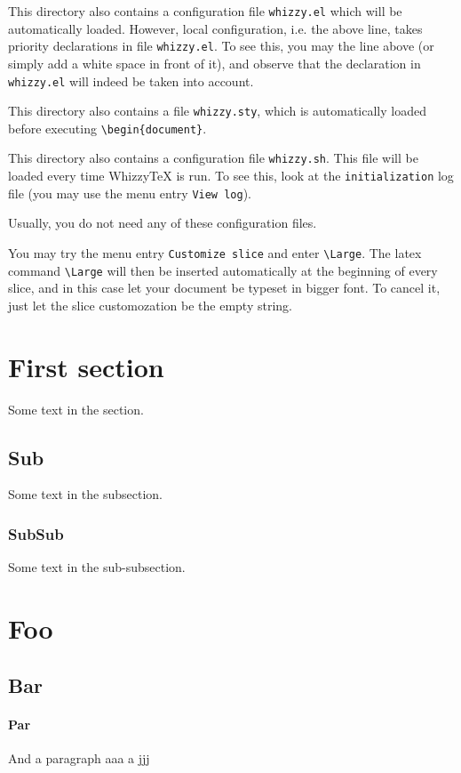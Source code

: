 \documentclass{article}
\begin{document}
This directory also contains a configuration file \texttt{whizzy.el} which
will be automatically loaded.  However, local configuration, {i.e.} the above
line, takes priority declarations in file \texttt{whizzy.el}.  To see this,
you may the line above (or simply add a white space in front of it), and
observe that the declaration in \texttt{whizzy.el} will indeed be taken into
account.

This directory also contains a file \texttt{whizzy.sty}, which is
automatically loaded before executing \verb$\begin{document}$.

This directory also contains a configuration file \texttt{whizzy.sh}.
This file will be loaded every time WhizzyTeX is run. To see this, look 
at the \texttt{initialization} log file (you may use the menu entry 
\texttt{View log}). 

Usually, you do not need any of these configuration files. 

You may try the menu entry \texttt{Customize slice} and enter 
\verb"\Large". The latex command \verb"\Large" will then be inserted
automatically at the beginning of every slice, and in this case let your
document be typeset in bigger font. To cancel it, just let the slice 
customozation be the empty string. 

\section {First section}

Some text in the section.   
 
\subsection {Sub}
  
Some text in the subsection.

\subsubsection {SubSub} 

Some text in the sub-subsection. 


\section{Foo}

\subsection {Bar}

\paragraph {Par}

And a paragraph aaa a jjj
\end{document}
